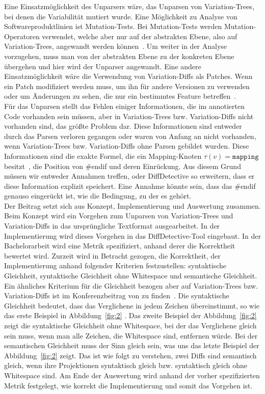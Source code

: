 Eine Einsatzmöglichkeit des Unparsers wäre, das Unparsen von Variation-Trees, bei denen die Variabilität mutiert wurde. Eine Möglichkeit zu Analyse von Softwareproduktlinien ist Mutation-Tests. Bei Mutation-Tests werden Mutation-Operatoren verwendet, welche aber nur auf der abstrakten Ebene, also auf Variation-Trees, angewandt werden können~\cite{ABT+:VaMoS16}. Um weiter in der Analyse vorzugehen, muss man von der abstrakten Ebene zu der konkreten Ebene übergehen und hier wird der Unparser angewandt. Eine andere Einsatzmöglichkeit wäre die Verwendung von Variation-Diffs als Patches. Wenn ein Patch modifiziert werden muss, um ihn für andere Versionen zu verwenden oder um Änderungen zu sehen, die nur ein bestimmtes Feature betreffen~\cite{BSG+:SPLC23}.\\


Für das Unparsen stellt das Fehlen einiger Informationen, die im annotierten Code vorhanden sein müssen, aber in Variation-Trees bzw. Variation-Diffs nicht vorhanden sind, das größte Problem dar. Diese Informationen sind entweder durch das Parsen verloren gegangen oder waren von Anfang an nicht vorhanden, wenn Variation-Trees bzw. Variation-Diffs ohne Parsen gebildet wurden. Diese Informationen sind die exakte Formel, die ein Mapping-Knoten $\tau(v) = \texttt{mapping}$ besitzt~\cite{BTS+:ESECFSE22}, die Position von \#endif und deren Einrückung. Aus diesem Grund müssen wir entweder Annahmen treffen, oder DiffDetective so erweitern, dass er diese Information explizit speichert. Eine Annahme könnte sein, dass das \#endif genauso eingerückt ist, wie die Bedingung, zu der es gehört.\\



Der Beitrag setzt sich aus Konzept, Implementierung und Auswertung zusammen. Beim Konzept wird ein Vorgehen zum Unparsen von Variation-Trees und Variation-Diffs in das ursprüngliche Textformat ausgearbeitet. In der Implementierung wird dieses Vorgehen in das DiffDetective-Tool eingebaut. In der Bachelorarbeit wird eine Metrik spezifiziert, anhand derer die Korrektheit bewertet wird. Zurzeit wird in Betracht gezogen, die Korrektheit, der Implementierung anhand folgender Kriterien festzustellen: syntaktische Gleichheit, syntaktische Gleichheit ohne Whitespace und semantische Gleichheit. Ein ähnliches Kriterium für die Gleichheit bezogen aber auf Variation-Trees bzw. Variation-Diffs ist im Konferenzbeitrag von %
 zu finden~\cite{BSG+:SPLC23}.  Die syntaktische Gleichheit bedeutet, dass das Verglichene in jedem Zeichen übereinstimmt, so wie das erste Beispiel in Abbildung~\ref{fig:2} . Das zweite Beispiel der Abbildung~\ref{fig:2} zeigt die syntaktische Gleichheit ohne Whitespace, bei der das Verglichene gleich sein muss, wenn man alle Zeichen, die Whitespace sind, entfernen würde. Bei der semantischen Gleichheit muss der Sinn gleich sein, was uns das letzte Beispiel der Abbildung~\ref{fig:2}    zeigt. Das ist wie folgt zu verstehen, zwei Diffs sind semantisch gleich, wenn ihre Projektionen syntaktisch gleich bzw. syntaktisch gleich ohne Whitespace sind. Am Ende der Auswertung wird anhand der vorher spezifizierten Metrik festgelegt, wie korrekt die Implementierung und somit das Vorgehen ist.\\


